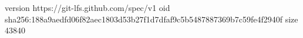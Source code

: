 version https://git-lfs.github.com/spec/v1
oid sha256:188a9aedfd06f82aec1803d53b27f1d7dfaf9c5b5487887369b7c59fe4f2940f
size 43840
